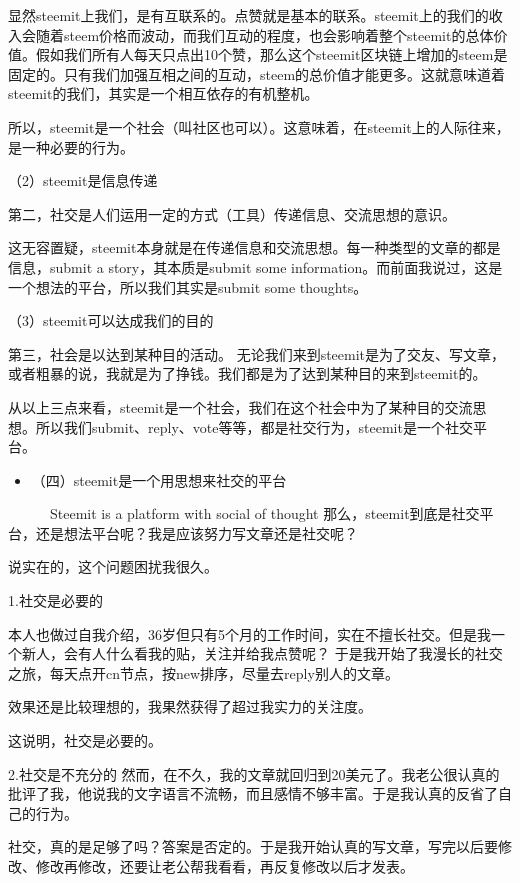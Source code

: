 \documentclass[]{ctexbook}
\providecommand{\tightlist}{%
  \setlength{\itemsep}{0pt}\setlength{\parskip}{0pt}}
\begin{document}
显然steemit上我们，是有互联系的。点赞就是基本的联系。steemit上的我们的收入会随着steem价格而波动，而我们互动的程度，也会影响着整个steemit的总体价值。假如我们所有人每天只点出10个赞，那么这个steemit区块链上增加的steem是固定的。只有我们加强互相之间的互动，steem的总价值才能更多。这就意味道着steemit的我们，其实是一个相互依存的有机整机。

所以，steemit是一个社会（叫社区也可以）。这意味着，在steemit上的人际往来，是一种必要的行为。

（2）steemit是信息传递

第二，社交是人们运用一定的方式（工具）传递信息、交流思想的意识。

这无容置疑，steemit本身就是在传递信息和交流思想。每一种类型的文章的都是信息，submit a story，其本质是submit some information。而前面我说过，这是一个想法的平台，所以我们其实是submit some thoughts。

（3）steemit可以达成我们的目的

第三，社会是以达到某种目的活动。
无论我们来到steemit是为了交友、写文章，或者粗暴的说，我就是为了挣钱。我们都是为了达到某种目的来到steemit的。

从以上三点来看，steemit是一个社会，我们在这个社会中为了某种目的交流思想。所以我们submit、reply、vote等等，都是社交行为，steemit是一个社交平台。

\begin{itemize}
\tightlist
\item
  （四）steemit是一个用思想来社交的平台
\end{itemize}

　　　Steemit is a platform with social of thought
那么，steemit到底是社交平台，还是想法平台呢？我是应该努力写文章还是社交呢？

说实在的，这个问题困扰我很久。

1.社交是必要的

本人也做过自我介绍，36岁但只有5个月的工作时间，实在不擅长社交。但是我一个新人，会有人什么看我的贴，关注并给我点赞呢？
于是我开始了我漫长的社交之旅，每天点开cn节点，按new排序，尽量去reply别人的文章。

效果还是比较理想的，我果然获得了超过我实力的关注度。

这说明，社交是必要的。

2.社交是不充分的
然而，在不久，我的文章就回归到20美元了。我老公很认真的批评了我，他说我的文字语言不流畅，而且感情不够丰富。于是我认真的反省了自己的行为。

社交，真的是足够了吗？答案是否定的。于是我开始认真的写文章，写完以后要修改、修改再修改，还要让老公帮我看看，再反复修改以后才发表。
\end{document}
